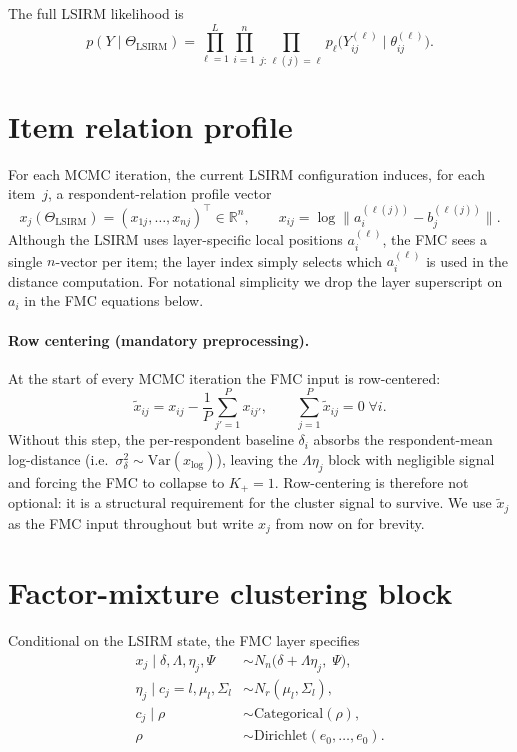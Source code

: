 \documentclass[11pt]{article}
\begin{document}
The full LSIRM likelihood is
\[
p(Y\mid\Theta_{\mathrm{LSIRM}})
=\prod_{\ell=1}^L\prod_{i=1}^n\prod_{j:\,\ell(j)=\ell}
p_\ell\bigl(Y_{ij}^{(\ell)}\mid\theta_{ij}^{(\ell)}\bigr).
\]

\section{Item relation profile}

For each MCMC iteration, the current LSIRM configuration induces, for each item~$j$, a respondent-relation profile vector
\[
x_j(\Theta_{\mathrm{LSIRM}})
=
(x_{1j},\dots,x_{nj})^\top \in \mathbb{R}^n,
\qquad
x_{ij} = \log \|a_i^{(\ell(j))}-b_j^{(\ell(j))}\|.
\]
Although the LSIRM uses layer-specific local positions $a_i^{(\ell)}$, the FMC sees a single $n$-vector per item; the layer index simply selects which $a_i^{(\ell)}$ is used in the distance computation.
For notational simplicity we drop the layer superscript on $a_i$ in the FMC equations below.

\paragraph{Row centering (mandatory preprocessing).}
At the start of every MCMC iteration the FMC input is row-centered:
\[
\widetilde{x}_{ij}=x_{ij}-\frac{1}{P}\sum_{j'=1}^P x_{ij'},\qquad
\sum_{j=1}^P \widetilde x_{ij}=0\;\forall i.
\]
Without this step, the per-respondent baseline $\delta_i$ absorbs the respondent-mean log-distance (i.e.\ $\sigma_\delta^2\sim\mathrm{Var}(x_{\log})$), leaving the $\Lambda\eta_j$ block with negligible signal and forcing the FMC to collapse to $K_+=1$.
Row-centering is therefore not optional: it is a structural requirement for the cluster signal to survive.
We use $\widetilde x_j$ as the FMC input throughout but write $x_j$ from now on for brevity.

\section{Factor-mixture clustering block}

Conditional on the LSIRM state, the FMC layer specifies
\begin{align}
x_j \mid \delta,\Lambda,\eta_j,\Psi
&\sim N_n\bigl(\delta+\Lambda\eta_j,\;\Psi\bigr),\label{eq:fmc-likelihood}\\
\eta_j \mid c_j=l,\mu_l,\Sigma_l &\sim N_r(\mu_l,\Sigma_l),\\
c_j \mid \rho &\sim \mathrm{Categorical}(\rho),\\
\rho &\sim \mathrm{Dirichlet}(e_0,\dots,e_0).
\end{align}
\end{document}
